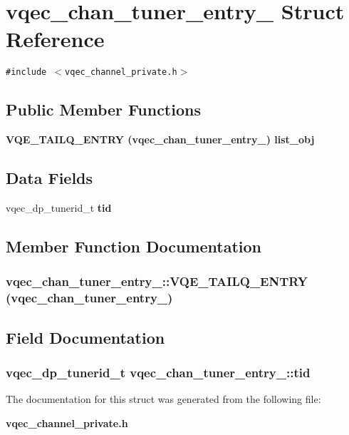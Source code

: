 \section{vqec\_\-chan\_\-tuner\_\-entry\_\- Struct Reference}
\label{structvqec__chan__tuner__entry__}
{\tt \#include $<$vqec\_\-channel\_\-private.h$>$}

\subsection*{Public Member Functions}
\begin{CompactItemize}
\item 
\bf{VQE\_\-TAILQ\_\-ENTRY} (\bf{vqec\_\-chan\_\-tuner\_\-entry\_\-}) list\_\-obj
\end{CompactItemize}
\subsection*{Data Fields}
\begin{CompactItemize}
\item 
vqec\_\-dp\_\-tunerid\_\-t \bf{tid}
\end{CompactItemize}


\subsection{Member Function Documentation}
\subsubsection{\setlength{\rightskip}{0pt plus 5cm}vqec\_\-chan\_\-tuner\_\-entry\_\-::VQE\_\-TAILQ\_\-ENTRY (\bf{vqec\_\-chan\_\-tuner\_\-entry\_\-})}\label{structvqec__chan__tuner__entry___b4a88880a9ce5d7adf581c8f557e4287}




\subsection{Field Documentation}
\subsubsection{\setlength{\rightskip}{0pt plus 5cm}vqec\_\-dp\_\-tunerid\_\-t \bf{vqec\_\-chan\_\-tuner\_\-entry\_\-::tid}}\label{structvqec__chan__tuner__entry___12fcaa4a820b00c5ce6c835bfa0a04d3}




The documentation for this struct was generated from the following file:\begin{CompactItemize}
\item 
\bf{vqec\_\-channel\_\-private.h}\end{CompactItemize}
